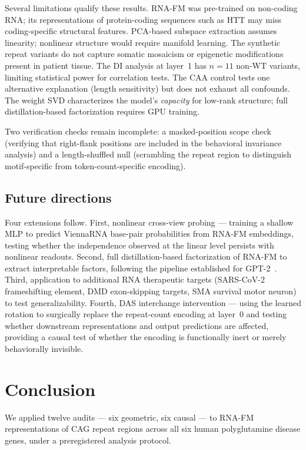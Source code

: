 \documentclass[11pt]{article}
\begin{document}
Several limitations qualify these results. RNA-FM was pre-trained
on non-coding RNA; its representations of protein-coding sequences
such as HTT may miss coding-specific structural features. PCA-based
subspace extraction assumes linearity; nonlinear structure would
require manifold learning. The synthetic repeat variants do not
capture somatic mosaicism or epigenetic modifications present in
patient tissue. The DI analysis at layer~1 has $n = 11$ non-WT
variants, limiting statistical power for correlation tests. The CAA
control tests one alternative explanation (length sensitivity) but
does not exhaust all confounds. The weight SVD characterizes the
model's \emph{capacity} for low-rank structure; full
distillation-based factorization requires GPU training.

Two verification checks remain incomplete: a masked-position scope
check (verifying that right-flank positions are included in the
behavioral invariance analysis) and a length-shuffled null (scrambling
the repeat region to distinguish motif-specific from
token-count-specific encoding).

\subsection{Future directions}

Four extensions follow. First, nonlinear cross-view probing ---
training a shallow MLP to predict ViennaRNA base-pair probabilities
from RNA-FM embeddings, testing whether the independence observed at
the linear level persists with nonlinear readouts. Second, full
distillation-based factorization of RNA-FM to extract interpretable
factors, following the pipeline established for
GPT-2~\citep{tower2026fac}. Third, application to additional RNA
therapeutic targets (SARS-CoV-2 frameshifting element, DMD
exon-skipping targets, SMA survival motor neuron) to test
generalizability. Fourth, DAS interchange intervention --- using
the learned rotation to surgically replace the repeat-count
encoding at layer~0 and testing whether downstream representations
and output predictions are affected, providing a causal test of
whether the encoding is functionally inert or merely behaviorally
invisible.


\section{Conclusion}
\label{sec:conclusion}

We applied twelve audits --- six geometric, six causal --- to RNA-FM
representations of CAG repeat regions across all six human
polyglutamine disease genes, under a preregistered analysis protocol.
\end{document}
